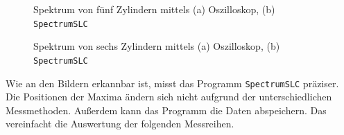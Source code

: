 \begin{figure}
    \caption{Spektrum von fünf Zylindern mittels (a) Oszilloskop, (b) \texttt{SpectrumSLC}}
\end{figure}
\begin{figure}
    \caption{Spektrum von sechs Zylindern mittels (a) Oszilloskop, (b) \texttt{SpectrumSLC}}
\end{figure}
\FloatBarrier
Wie an den Bildern erkannbar ist, misst das Programm \texttt{SpectrumSLC} präziser.
Die Positionen der Maxima ändern sich nicht aufgrund der unterschiedlichen Messmethoden.
Außerdem kann das Programm die Daten abspeichern. Das vereinfacht die Auswertung der folgenden Messreihen.

